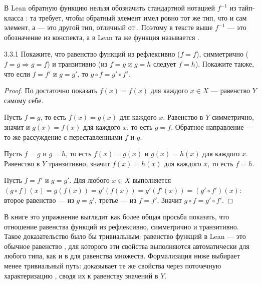 \begin{remark}
В Lean обратную функцию нельзя обозначить стандартной нотацией $f^{-1}$ из тайп-класса
: та требует, чтобы обратный элемент имел ровно тот же тип, что и сам элемент, а
 — это другой тип, отличный от . Поэтому в тексте выше
$f^{-1}$ — это обозначение из конспекта, а в Lean та же функция называется .
\end{remark}

\begin{exercise}{3.3.1}{}
Покажите, что равенство функций из  рефлексивно
($f=f$), симметрично ($f=g \Rightarrow g=f$) и транзитивно (из $f=g$ и $g=h$ следует $f=h$).
Покажите также, что если $f=f'$ и $g=g'$, то $g\circ f = g'\circ f'$.
\end{exercise}

\begin{proof}
 По  достаточно показать
$f(x)=f(x)$ для каждого $x\in X$ — равенство $Y$ самому себе.

 Пусть $f=g$, то есть $f(x)=g(x)$ для каждого $x$. Равенство в
$Y$ симметрично, значит и $g(x)=f(x)$ для каждого $x$, то есть $g=f$. Обратное направление —
то же рассуждение с переставленными $f$ и $g$.

 Пусть $f=g$ и $g=h$, то есть $f(x)=g(x)$ и $g(x)=h(x)$ для
каждого $x$. Равенство в $Y$ транзитивно, значит $f(x)=h(x)$ для каждого $x$, то есть $f=h$.

 Пусть $f=f'$ и $g=g'$. Для любого $x\in X$
выполняется $(g\circ f)(x) = g(f(x)) = g'(f(x)) = g'(f'(x)) = (g'\circ f')(x)$: второе
равенство — из $g=g'$, третье — из $f=f'$. Значит $g\circ f = g'\circ f'$.
\end{proof}

\begin{remark}
В книге это упражнение выглядит как более общая просьба показать, что отношение равенства
функций из  рефлексивно, симметрично и транзитивно. Такое
доказательство было бы тривиальным: равенство функций в Lean — это обычное равенство
\code{=}, для которого эти свойства выполняются автоматически для любого типа, как и в
 для равенства множеств. Формализация ниже выбирает менее
тривиальный путь: доказывает те же свойства через поточечную характеризацию
, сводя их к равенству значений в $Y$.
\end{remark}

